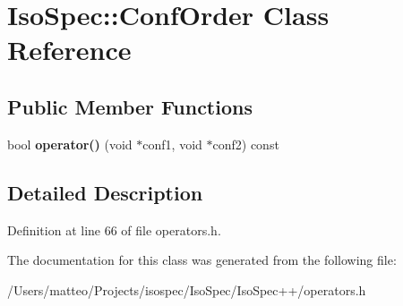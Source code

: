 \hypertarget{class_iso_spec_1_1_conf_order}{}\section{Iso\+Spec\+:\+:Conf\+Order Class Reference}
\label{class_iso_spec_1_1_conf_order}
\subsection*{Public Member Functions}
\begin{DoxyCompactItemize}
\item 
\mbox{\label{class_iso_spec_1_1_conf_order_a5ab8109685af0925b461ce532fa45a74}} 
bool {\bfseries operator()} (void $\ast$conf1, void $\ast$conf2) const
\end{DoxyCompactItemize}


\subsection{Detailed Description}


Definition at line 66 of file operators.\+h.



The documentation for this class was generated from the following file\+:\begin{DoxyCompactItemize}
\item 
/\+Users/matteo/\+Projects/isospec/\+Iso\+Spec/\+Iso\+Spec++/operators.\+h\end{DoxyCompactItemize}
